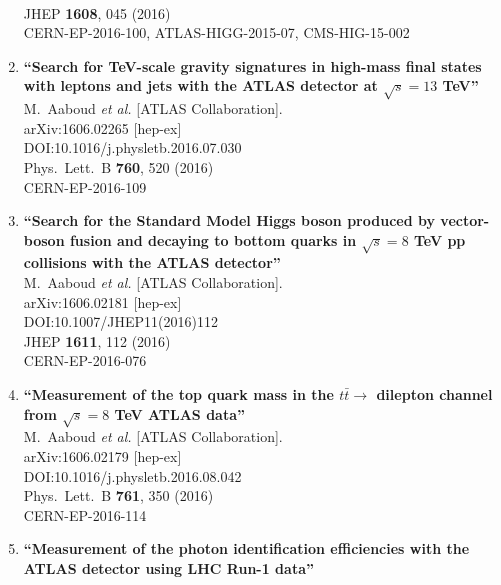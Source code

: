 \documentclass{article}
\begin{document}
\begin{enumerate}
  \\{}JHEP {\bf 1608}, 045 (2016)
  \\{}CERN-EP-2016-100, ATLAS-HIGG-2015-07, CMS-HIG-15-002
\item%
{\bf ``Search for TeV-scale gravity signatures in high-mass final states with leptons and jets with the ATLAS detector at $\sqrt{s}=13$ TeV''}
  \\{}M.~Aaboud {\it et al.} [ATLAS Collaboration].
  \\{}arXiv:1606.02265 [hep-ex]
  \\{}DOI:10.1016/j.physletb.2016.07.030
  \\{}Phys.\ Lett.\ B {\bf 760}, 520 (2016)
  \\{}CERN-EP-2016-109
\item%
{\bf ``Search for the Standard Model Higgs boson produced by vector-boson fusion and decaying to bottom quarks in $ \sqrt{s}=8 $ TeV pp collisions with the ATLAS detector''}
  \\{}M.~Aaboud {\it et al.} [ATLAS Collaboration].
  \\{}arXiv:1606.02181 [hep-ex]
  \\{}DOI:10.1007/JHEP11(2016)112
  \\{}JHEP {\bf 1611}, 112 (2016)
  \\{}CERN-EP-2016-076
\item%
{\bf ``Measurement of the top quark mass in the $t\bar{t}\to$ dilepton channel from $\sqrt{s}=8$ TeV ATLAS data''}
  \\{}M.~Aaboud {\it et al.} [ATLAS Collaboration].
  \\{}arXiv:1606.02179 [hep-ex]
  \\{}DOI:10.1016/j.physletb.2016.08.042
  \\{}Phys.\ Lett.\ B {\bf 761}, 350 (2016)
  \\{}CERN-EP-2016-114
\item%
{\bf ``Measurement of the photon identification efficiencies with the ATLAS detector using LHC Run-1 data''}

\end{enumerate}
\end{document}

